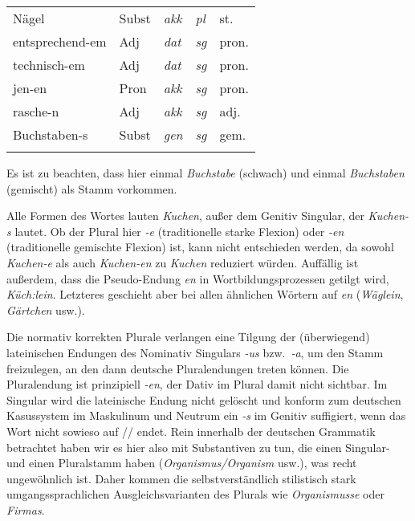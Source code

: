 \begin{center}
\begin{tabular}[h]{lllll}
    Nägel & Subst & \textit{akk} & \textit{pl} & st. \\
    entsprechend-em & Adj & \textit{dat} & \textit{sg} & pron. \\
    technisch-em & Adj & \textit{dat} & \textit{sg} & pron. \\
    jen-en & Pron & \textit{akk} & \textit{sg} & pron. \\
    rasche-n & Adj & \textit{akk} & \textit{sg} & adj. \\
    Buchstaben-s & Subst & \textit{gen} & \textit{sg} & gem. \\
    \lspbottomrule
  \end{tabular}
\end{center}

Es ist zu beachten, dass hier einmal \textit{Buchstabe} (schwach) und einmal \textit{Buchstaben} (gemischt) als Stamm vorkommen.


\begin{sloppypar}
Alle Formen des Wortes lauten \textit{Kuchen}, außer dem Genitiv Singular, der \textit{Kuchen-s} lautet.
Ob der Plural hier \textit{-e} (traditionelle starke Flexion) oder \textit{-en} (traditionelle gemischte Flexion) ist, kann nicht entschieden werden, da sowohl \textit{\Ast Kuchen-e} als auch \textit{\Ast Kuchen-en} zu \textit{Kuchen} reduziert würden.
Auffällig ist außerdem, dass die Pseudo-Endung \textit{en} in Wortbildungsprozessen getilgt wird, \zB \textit{Küch:}\textit{lein}.
Letzteres geschieht aber bei allen ähnlichen Wörtern auf \textit{en} (\textit{Wäglein}, \textit{Gärtchen} usw.).
\end{sloppypar}


Die normativ korrekten Plurale verlangen eine Tilgung der (überwiegend) lateinischen Endungen des Nominativ Singulars \textit{-us} bzw.\ \textit{-a}, um den Stamm freizulegen, an den dann deutsche Pluralendungen treten können.
Die Pluralendung ist prinzipiell \textit{-en}, der Dativ im Plural damit nicht sichtbar.
Im Singular wird die lateinische Endung nicht gelöscht und konform zum deutschen Kasussystem im Maskulinum und Neutrum ein \textit{-s} im Genitiv suffigiert, wenn das Wort nicht sowieso auf // endet.
Rein innerhalb der deutschen Grammatik betrachtet haben wir es hier also mit Substantiven zu tun, die einen Singular- und einen Pluralstamm haben (\textit{Organismus\slash Organism} usw.), was recht ungewöhnlich ist.
Daher kommen die selbstverständlich stilistisch stark umgangssprachlichen Ausgleichsvarianten des Plurals wie \textit{Organismusse} oder \textit{Firmas}.

